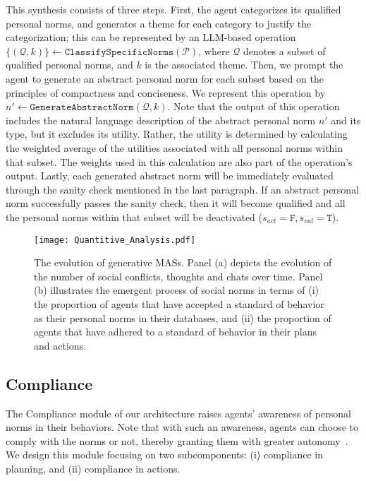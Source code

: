 \documentclass{article}
\begin{document}
This synthesis consists of three steps.
First,  the agent categorizes its qualified personal norms, and generates a theme for each category to justify the categorization; this can be represented by an LLM-based operation $\{ (\mathcal{Q}, k) \} \leftarrow \texttt{ClassifySpecificNorms}(\mathcal{P})$, where  $\mathcal{Q}$ denotes a subset of qualified personal norms, and $k$ is the associated theme. Then, we prompt the agent to generate an abstract personal norm for each subset based on the principles of compactness and conciseness.
We represent this operation by  $ n' \leftarrow \texttt{GenerateAbstractNorm}(\mathcal{Q}, k)$.
Note that the output of this operation includes the natural language description of the abstract personal norm  $n'$ and its type, but it excludes its utility. Rather, the utility is determined by calculating the weighted average of the utilities associated with all personal norms within that subset. The weights used in this calculation are also part of the operation's output.
Lastly, each generated abstract norm will be immediately evaluated through the sanity check mentioned in the last paragraph. 
If an abstract personal norm successfully passes the sanity check, then it will become qualified and all the personal norms within that subset will be deactivated ($s_{act}=\texttt{F},s_{val}=\texttt{T}$). 





\begin{figure*}[htbp]
    \centering
    \texttt{[image: Quantitive\_Analysis.pdf]}
    \vspace{-0.3cm}
    \caption{The evolution of generative MASs. Panel (a) depicts the evolution of the number of social conflicts, thoughts and chats over time. Panel (b) illustrates the emergent process of social norms in terms of (i) the proportion of agents that have accepted a standard of behavior as their personal norms in their databases, and (ii) the proportion of agents that have adhered to a standard of behavior   in their plans and actions. 
    }
    \vspace{-0.3cm}
    \label{fig: Quantitative Analysis}
\end{figure*}

\subsection{Compliance}
The Compliance module of our architecture raises agents' awareness of personal norms in their behaviors.
Note that with such an awareness, agents can choose to comply with the norms or not, thereby granting them with greater autonomy~\cite{conte1998autonomous,criado2011open}. 
We design this module focusing on two subcomponents: (i) compliance in planning, and (ii) compliance in actions.
\end{document}
